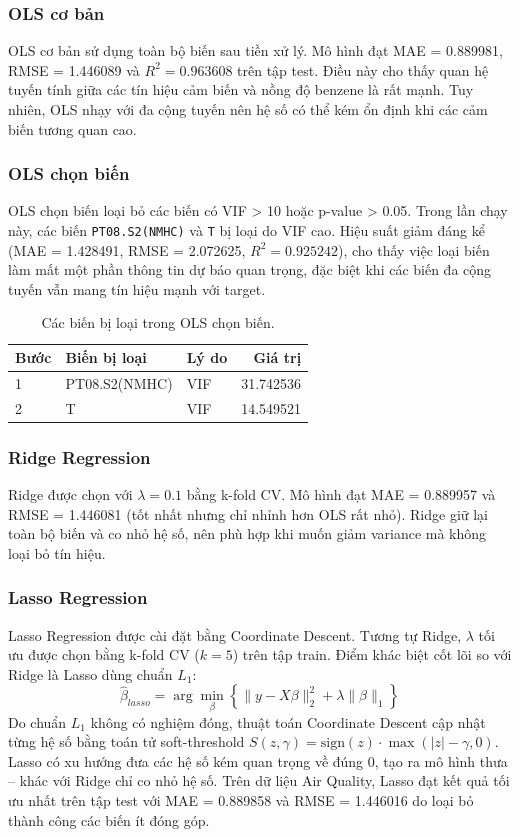 \documentclass[a4paper]{article}
\begin{document}
\subsubsection{OLS cơ bản}
OLS cơ bản sử dụng toàn bộ biến sau tiền xử lý. Mô hình đạt MAE = 0.889981, RMSE = 1.446089 và $R^2 = 0.963608$ trên tập test. Điều này cho thấy quan hệ tuyến tính giữa các tín hiệu cảm biến và nồng độ benzene là rất mạnh. Tuy nhiên, OLS nhạy với đa cộng tuyến nên hệ số có thể kém ổn định khi các cảm biến tương quan cao.

\subsubsection{OLS chọn biến}
OLS chọn biến loại bỏ các biến có VIF > 10 hoặc p-value > 0.05. Trong lần chạy này, các biến \texttt{PT08.S2(NMHC)} và \texttt{T} bị loại do VIF cao. Hiệu suất giảm đáng kể (MAE = 1.428491, RMSE = 2.072625, $R^2 = 0.925242$), cho thấy việc loại biến làm mất một phần thông tin dự báo quan trọng, đặc biệt khi các biến đa cộng tuyến vẫn mang tín hiệu mạnh với target.

\begin{table}[H]
\centering
\begin{tabular}{l l l r}
\hline
Bước & Biến bị loại & Lý do & Giá trị \\
\hline
1 & PT08.S2(NMHC) & VIF & 31.742536 \\
2 & T & VIF & 14.549521 \\
\hline
\end{tabular}
\caption{Các biến bị loại trong OLS chọn biến.}
\end{table}

\subsubsection{Ridge Regression}
Ridge được chọn với $\lambda=0.1$ bằng k-fold CV. Mô hình đạt MAE = 0.889957 và RMSE = 1.446081 (tốt nhất nhưng chỉ nhỉnh hơn OLS rất nhỏ). Ridge giữ lại toàn bộ biến và co nhỏ hệ số, nên phù hợp khi muốn giảm variance mà không loại bỏ tín hiệu.

\subsubsection{Lasso Regression}
Lasso Regression được cài đặt bằng Coordinate Descent. Tương tự Ridge, $\lambda$ tối ưu được chọn bằng k-fold CV ($k=5$) trên tập train. Điểm khác biệt cốt lõi so với Ridge là Lasso dùng chuẩn $L_1$:
\begin{equation}
\hat{\beta}_{lasso} = \arg\min_{\beta}\left\{\lVert y - X\beta \rVert_2^2 + \lambda \lVert \beta \rVert_1\right\}
\end{equation}
Do chuẩn $L_1$ không có nghiệm đóng, thuật toán Coordinate Descent cập nhật từng hệ số bằng toán tử soft-threshold $S(z,\gamma)=\text{sign}(z)\cdot\max(|z|-\gamma,0)$. Lasso có xu hướng đưa các hệ số kém quan trọng về đúng 0, tạo ra mô hình thưa -- khác với Ridge chỉ co nhỏ hệ số. Trên dữ liệu Air Quality, Lasso đạt kết quả tối ưu nhất trên tập test với MAE = 0.889858 và RMSE = 1.446016 do loại bỏ thành công các biến ít đóng góp.
\end{document}
